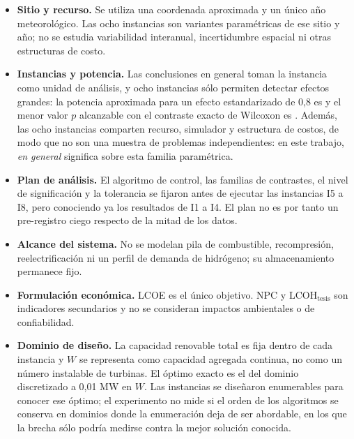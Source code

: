 \begin{itemize}
    \item \textbf{Sitio y recurso.} Se utiliza una coordenada aproximada y un único año meteorológico. Las ocho instancias son variantes paramétricas de ese sitio y año; no se estudia variabilidad interanual, incertidumbre espacial ni otras estructuras de costo.
    \item \textbf{Instancias y potencia.} Las conclusiones en general toman la instancia como unidad de análisis, y ocho instancias sólo permiten detectar efectos grandes: la potencia aproximada para un efecto estandarizado de 0,8 es \PowerInstancesLarge{} y el menor valor $p$ alcanzable con el contraste exacto de Wilcoxon es \WilcoxonMinP. Además, las ocho instancias comparten recurso, simulador y estructura de costos, de modo que no son una muestra de problemas independientes: en este trabajo, \emph{en general} significa sobre esta familia paramétrica.
    \item \textbf{Plan de análisis.} El algoritmo de control, las familias de contrastes, el nivel de significación y la tolerancia se fijaron antes de ejecutar las instancias I5 a I8, pero conociendo ya los resultados de I1 a I4. El plan no es por tanto un pre-registro ciego respecto de la mitad de los datos.
    \item \textbf{Alcance del sistema.} No se modelan pila de combustible, recompresión, reelectrificación ni un perfil de demanda de hidrógeno; su almacenamiento permanece fijo.
    \item \textbf{Formulación económica.} LCOE es el único objetivo. NPC y $\mathrm{LCOH}_{\mathrm{tesis}}$ son indicadores secundarios y no se consideran impactos ambientales o de confiabilidad.
    \item \textbf{Dominio de diseño.} La capacidad renovable total es fija dentro de cada instancia y $W$ se representa como capacidad agregada continua, no como un número instalable de turbinas. El óptimo exacto es el del dominio discretizado a 0,01 MW en $W$. Las instancias se diseñaron enumerables para conocer ese óptimo; el experimento no mide si el orden de los algoritmos se conserva en dominios donde la enumeración deja de ser abordable, en los que la brecha sólo podría medirse contra la mejor solución conocida.

\end{itemize}
